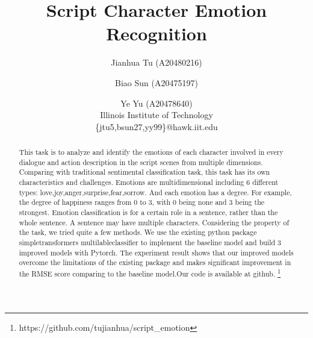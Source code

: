 \documentclass[12pt,twocolumn,letterpaper]{article}
\begin{document}
\title{Script Character Emotion Recognition}

\author{Jianhua Tu (A20480216)\\
\and Biao Sun (A20475197)\\
\and Ye Yu (A20478640)\\
Illinois Institute of Technology\\ 
\{jtu5,bsun27,yy99\}@hawk.iit.edu
}

\maketitle

\begin{abstract}
This task is to analyze and identify the emotions of each character involved in every dialogue and action description in the script scenes from multiple dimensions. Comparing with traditional sentimental classification task, this task has its own characteristics and challenges. Emotions are multidimensional including 6 different types: love,joy,anger,surprise,fear,sorrow. And each emotion has a degree. For example, the degree of happiness ranges from 0 to 3, with 0 being none and 3 being the strongest.  Emotion classification is for a certain role in a sentence, rather than the whole sentence. A sentence may have multiple characters.  Considering the property of the task, we tried quite a few methods. We use the existing python package simpletransformers multilableclassifier to implement the baseline model and build 3 improved models with Pytorch. The experiment result shows that our improved models overcome the limitations of the existing package and makes significant improvement in the RMSE score comparing to the baseline model.Our code is available at github. \footnote{https://github.com/tujianhua/script\_emotion}
\end{abstract}

\end{document}
